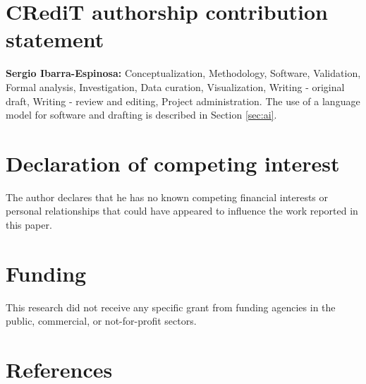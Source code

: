 \documentclass[preprint,
3p]{elsarticle} %
\begin{document}
\section{CRediT authorship contribution
statement}\label{credit-authorship-contribution-statement}

\textbf{Sergio Ibarra-Espinosa:} Conceptualization, Methodology,
Software, Validation, Formal analysis, Investigation, Data curation,
Visualization, Writing - original draft, Writing - review and editing,
Project administration. The use of a language model for software and
drafting is described in Section \ref{sec:ai}.

\section{Declaration of competing
interest}\label{declaration-of-competing-interest}

The author declares that he has no known competing financial interests
or personal relationships that could have appeared to influence the work
reported in this paper.

\section{Funding}\label{funding}

This research did not receive any specific grant from funding agencies
in the public, commercial, or not-for-profit sectors.

\section*{References}\label{references}
\end{document}
